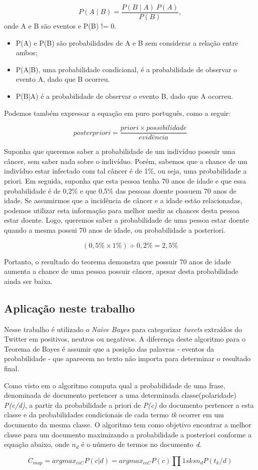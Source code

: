 $$ P(A \mid B) = \frac{P(B \mid A) \ P(A)}{P(B)}, $$
onde A e B são eventos e P(B) != 0.

\begin{itemize}
	\item P(A) e P(B) são probabilidades de A e B sem considerar a relação entre ambos;
	\item P(A|B), uma probabilidade condicional, é a probabilidade de observar o evento A, dado que B ocorreu.
	\item P(B|A) é a probabilidade de observar o evento B, dado que A ocorreu.
\end{itemize}

Podemos também expressar a equação em puro português, como a seguir:

$$ posterpriori = \frac{priori \times  possibilidade}{evid\hat{e}ncia} $$

Suponha que queremos saber a probabilidade de um indivíduo possuir uma câncer, sem saber nada sobre o indivíduo. Porém, sabemos que a chance de um indivíduo estar infectado com tal câncer é de 1\%, ou seja, uma probabilidade a priori.
Em seguida, suponha que esta pessoa tenha 70 anos de idade e que essa probabilidade é de 0,2\% e que 0,5\% das pessoas doente possuem 70 anos de idade. Se assumirmos que a incidência de câncer e a idade estão relacionadas, podemos utilizar esta informação para melhor medir as chances desta pessoa estar doente. Logo, queremos saber a probabilidade de uma pessoa estar doente quando a mesma possui 70 anos de idade, ou probabilidade a posteriori.

$$ (0,5\% \times 1\%) \div 0,2\% = 2,5\% $$

Portanto, o resultado do teorema demonstra que possuir 70 anos de idade aumenta a chance de uma pessoa possuir câncer, apesar desta probabilidade ainda ser baixa.

\subsection{Aplicação neste trabalho}

Nesse trabalho é utilizado o \emph{Naive Bayes} para categorizar \textit{tweets} extraídos do Twitter em positivos, neutros ou negativos. A diferença deste algoritmo para o Teorema de Bayes é assumir que a posição das palavras - eventos da probabilidade - que aparecem no texto não importa para determinar o resultado final.

Como visto em \cite{lucca2013implementaccao} o algoritmo computa qual a probabilidade de uma frase, denominada de documento pertencer a uma determinada classe(polaridade) \emph{P(c/d)}, a partir da probabilidade a priori de \emph{P(c)} do documento pertencer a esta classe e da probabilidades condicionais de cada termo \emph{tk} ocorrer em um documento da mesma classe. O algoritmo tem como objetivo encontrar a melhor classe para um documento maximizando a probabilidade a posteriori conforme a equação abaixo, onde $ n_{d} $ é o número de termos no documento \emph{d}. 

$$ C_{map}= argmax_{c \epsilon C}P(c|d)=argmax_{c \epsilon C}P(c)\prod 1sksn_{d}P(t_{k}/d) $$